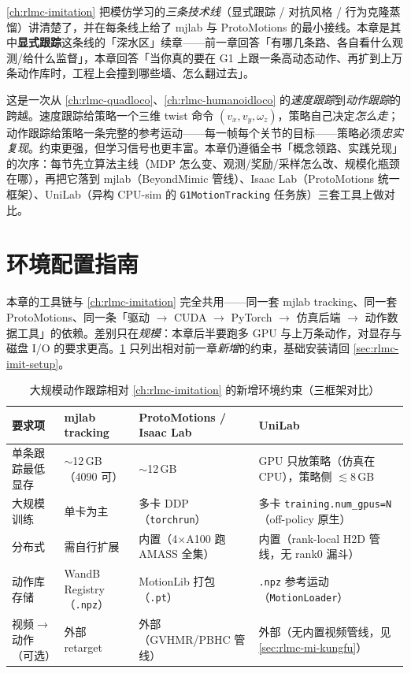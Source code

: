 \cref{ch:rlmc-imitation} 把模仿学习的\emph{三条技术线}（显式跟踪 / 对抗风格 / 行为克隆蒸馏）讲清楚了，并在每条线上给了 mjlab 与 ProtoMotions 的最小接线。本章是其中\textbf{显式跟踪}这条线的「深水区」续章——前一章回答「有哪几条路、各自看什么观测/给什么监督」，本章回答「当你真的要在 G1 上跟一条高动态动作、再扩到上万条动作库时，工程上会撞到哪些墙、怎么翻过去」。

这是一次从 \cref{ch:rlmc-quadloco}、\cref{ch:rlmc-humanoidloco} 的\emph{速度跟踪}到\emph{动作跟踪}的跨越。速度跟踪给策略一个三维 twist 命令 $(v_x, v_y, \omega_z)$，策略自己决定\emph{怎么走}；动作跟踪给策略一条完整的参考运动——每一帧每个关节的目标——策略必须\emph{忠实复现}。约束更强，但学习信号也更丰富。本章仍遵循全书「概念领路、实践兑现」的次序：每节先立算法主线（MDP 怎么变、观测/奖励/采样怎么改、规模化瓶颈在哪），再把它落到 mjlab（BeyondMimic 管线）、Isaac Lab（ProtoMotions 统一框架）、UniLab（异构 CPU-sim 的 \texttt{G1MotionTracking} 任务族）三套工具上做对比。

\section*{环境配置指南}
\label{sec:rlmc-mi-setup}

本章的工具链与 \cref{ch:rlmc-imitation} 完全共用——同一套 mjlab tracking、同一套 ProtoMotions、同一条「驱动 $\to$ CUDA $\to$ PyTorch $\to$ 仿真后端 $\to$ 动作数据工具」的依赖。差别只在\emph{规模}：本章后半要跑多 GPU 与上万条动作，对显存与磁盘 I/O 的要求更高。\cref{tab:rlmc-mi-req} 只列出相对前一章\emph{新增}的约束，基础安装请回 \cref{sec:rlmc-imit-setup}。

\begin{table}[ht]
\centering
\small
\caption{大规模动作跟踪相对 \cref{ch:rlmc-imitation} 的新增环境约束（三框架对比）}
\label{tab:rlmc-mi-req}
\begin{tabular}{@{}llll@{}}
\toprule
要求项 & mjlab tracking & ProtoMotions / Isaac Lab & UniLab \\
\midrule
单条跟踪最低显存 & $\sim$12\,GB（4090 可） & $\sim$12\,GB & GPU 只放策略（仿真在 CPU），策略侧 $\lesssim$8\,GB \\
大规模训练 & 单卡为主 & 多卡 DDP（\verb|torchrun|） & 多卡 \verb|training.num_gpus=N|（off-policy 原生） \\
分布式 & 需自行扩展 & 内置（4$\times$A100 跑 AMASS 全集） & 内置（rank-local H2D 管线，无 rank0 漏斗） \\
动作库存储 & WandB Registry（\verb|.npz|） & MotionLib 打包（\verb|.pt|） & \verb|.npz| 参考运动（\verb|MotionLoader|） \\
视频$\to$动作（可选） & 外部 retarget & 外部（GVHMR/PBHC 管线） & 外部（无内置视频管线，见 \cref{sec:rlmc-mi-kungfu}） \\
\bottomrule
\end{tabular}
\end{table}

